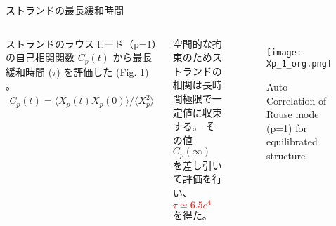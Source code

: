 \begin{columns}[totalwidth=.85\linewidth]
		\begin{itembox}[l]{ストランドの最長緩和時間}
			\begin{columns}[totalwidth=\linewidth]
				ストランドのラウスモード（p=1）の自己相関関数 $C_p(t)$ から最長緩和時間 ($\tau$) を評価した (Fig. \ref{ac-xp}) 。
				\begin{align*}
					C_p(t) = \langle X_p(t)X_p(0) \rangle/\langle X_p^2 \rangle
				\end{align*}
				
				空間的な拘束のためストランドの相関は長時間極限で一定値に収束する。
				その値 $C_p(\infty)$ を差し引いて評価を行い、\textcolor{red}{$\tau \simeq 6.5e^{4}$} を得た。
				
				\begin{figure}[htb]
					\centering
						\texttt{[image: Xp\_1\_org.png]}
						\caption{Auto Correlation of Rouse mode (p=1) for equilibrated structure}
						\label{ac-xp}
				\end{figure}
				\end{columns}
		\end{itembox}

\end{columns}